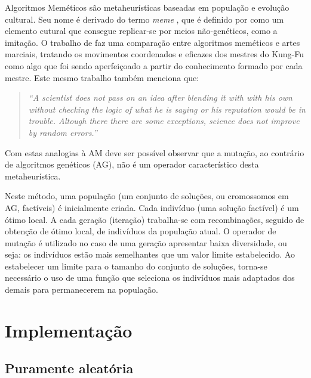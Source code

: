 Algoritmos Meméticos \cite{moscato1} são metaheurísticas baseadas
em população e evolução cultural.
Seu nome é derivado do termo \textit{meme} \cite{dawkins}, que é
definido por \cite{oxford-dict} como um elemento cutural que consegue
replicar-se por meios não-genéticos, como a imitação.
O trabalho de \cite{moscato1} faz uma comparação entre algoritmos
meméticos e artes marciais, tratando os movimentos coordenados e
eficazes dos mestres do Kung-Fu como algo que foi sendo aperfeiçoado
a partir do conhecimento formado por cada mestre. Este mesmo trabalho
também menciona que:
\begin{quote}
\textit{``A scientist does not pass on an idea after blending it with
  with his own without checking the logic of what he is saying or his
  reputation would be in trouble. Altough there there are some
  exceptions, science does not improve by random errors.''}
\end{quote}
Com estas analogias à AM deve ser possível observar que a mutação, ao
contrário de algoritmos genéticos (AG), não é um operador
característico desta metaheurística.

Neste método, uma população (um conjunto de soluções, ou cromossomos
em AG, factíveis) é
inicialmente criada. Cada indivíduo (uma solução factível) é um ótimo
local. A cada geração (iteração) trabalha-se com recombinações,
seguido de obtenção de ótimo local, de indivíduos da população
atual. O operador de mutação é utilizado no caso de uma
geração apresentar baixa diversidade, ou seja: os indivíduos estão
mais semelhantes que um valor limite estabelecido.
Ao estabelecer um limite para o tamanho do conjunto de soluções,
torna-se necessário o uso de uma função que seleciona os indivíduos
mais adaptados dos demais para permanecerem na população.


\section{Implementação}

\subsection{Puramente aleatória}

